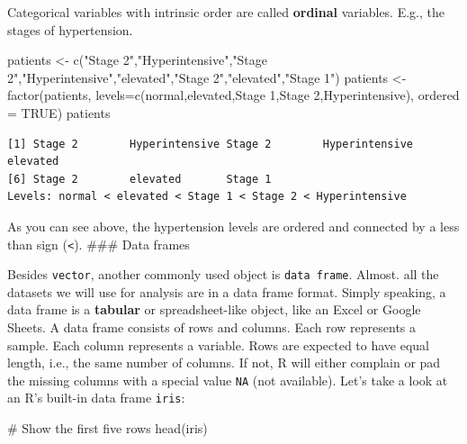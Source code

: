 \documentclass[
  letterpaper,
]{book}
\newenvironment{Shaded}{\begin{snugshade}}{\end{snugshade}}
\newcommand{\AttributeTok}[1]{\textcolor[rgb]{0.40,0.45,0.13}{#1}}
\newcommand{\CommentTok}[1]{\textcolor[rgb]{0.37,0.37,0.37}{#1}}
\newcommand{\ConstantTok}[1]{\textcolor[rgb]{0.56,0.35,0.01}{#1}}
\newcommand{\FunctionTok}[1]{\textcolor[rgb]{0.28,0.35,0.67}{#1}}
\newcommand{\NormalTok}[1]{\textcolor[rgb]{0.00,0.23,0.31}{#1}}
\newcommand{\OtherTok}[1]{\textcolor[rgb]{0.00,0.23,0.31}{#1}}
\newcommand{\StringTok}[1]{\textcolor[rgb]{0.13,0.47,0.30}{#1}}
\begin{document}
Categorical variables with intrinsic order are called \textbf{ordinal}
variables. E.g., the stages of hypertension.

\begin{Shaded}
\begin{Highlighting}[]
\NormalTok{patients }\OtherTok{\textless{}{-}} \FunctionTok{c}\NormalTok{(}\StringTok{"Stage 2"}\NormalTok{,}\StringTok{"Hyperintensive"}\NormalTok{,}\StringTok{"Stage 2"}\NormalTok{,}\StringTok{"Hyperintensive"}\NormalTok{,}\StringTok{"elevated"}\NormalTok{,}\StringTok{"Stage 2"}\NormalTok{,}\StringTok{"elevated"}\NormalTok{,}\StringTok{"Stage 1"}\NormalTok{)}
\NormalTok{patients }\OtherTok{\textless{}{-}} \FunctionTok{factor}\NormalTok{(patients,}
                   \AttributeTok{levels=}\FunctionTok{c}\NormalTok{(}\StringTok{\textquotesingle{}normal\textquotesingle{}}\NormalTok{,}\StringTok{\textquotesingle{}elevated\textquotesingle{}}\NormalTok{,}\StringTok{\textquotesingle{}Stage 1\textquotesingle{}}\NormalTok{,}\StringTok{\textquotesingle{}Stage 2\textquotesingle{}}\NormalTok{,}\StringTok{\textquotesingle{}Hyperintensive\textquotesingle{}}\NormalTok{),}
                   \AttributeTok{ordered =} \ConstantTok{TRUE}\NormalTok{)}
\NormalTok{patients}
\end{Highlighting}
\end{Shaded}

\begin{verbatim}
[1] Stage 2        Hyperintensive Stage 2        Hyperintensive elevated      
[6] Stage 2        elevated       Stage 1       
Levels: normal < elevated < Stage 1 < Stage 2 < Hyperintensive
\end{verbatim}

As you can see above, the hypertension levels are ordered and connected
by a less than sign (\texttt{\textless{}}). \#\#\# Data frames

Besides \texttt{vector}, another commonly used object is
\texttt{data\ frame}. Almost. all the datasets we will use for analysis
are in a data frame format. Simply speaking, a data frame is a
\textbf{tabular} or spreadsheet-like object, like an Excel or Google
Sheets. A data frame consists of rows and columns. Each row represents a
sample. Each column represents a variable. Rows are expected to have
equal length, i.e., the same number of columns. If not, R will either
complain or pad the missing columns with a special value \texttt{NA}
(not available). Let's take a look at an R's built-in data frame
\texttt{iris}:

\begin{Shaded}
\begin{Highlighting}[]
\CommentTok{\# Show the first five rows}
\FunctionTok{head}\NormalTok{(iris)}
\end{Highlighting}
\end{Shaded}
\end{document}
